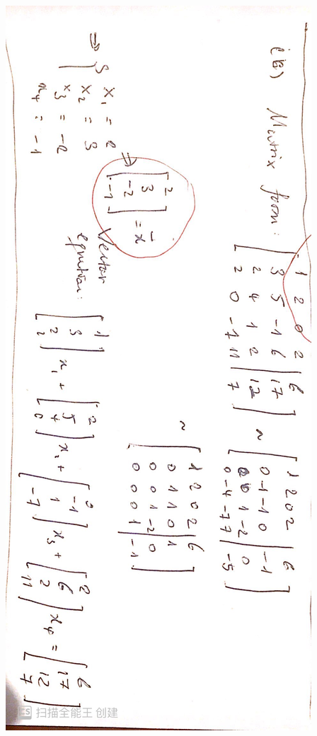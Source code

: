 \documentclass[]{book}
\theoremstyle{definition}
\newcommand{\0}{\mathbf{0}}
\begin{document}
\begin{enumerate}[label=\arabic*\degree]
\includegraphics[scale=0.15, angle=90]{images/1b.jpg}\bigbreak

\end{enumerate}
\end{document}
